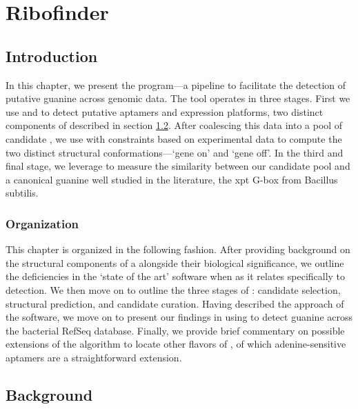 
\chapter{Ribofinder}
\label{ch:rfinder}


\section{Introduction}
\label{sec:rfinder:intro}

In this chapter, we present the \rfinder program---a pipeline to facilitate the
detection of putative guanine \rbs across genomic data. The \rfinder
tool operates in three stages. First we use \infernal and \tthp to detect
putative aptamers and expression platforms, two distinct components of
\rbs described in section \ref{sec:rfinder:bkgrnd}. After coalescing
this data into a pool of candidate \rbs, we use \rfold with constraints
based on experimental data to compute the two distinct structural
conformations---`gene on' and `gene off'. In the third and final stage, we
leverage \foldalign to measure the similarity between our candidate pool and a
canonical guanine \rb well studied in the literature, the xpt G-box
\rb from Bacillus subtilis.

\subsection{Organization}
\label{subsec:rfinder:org}

This chapter is organized in the following fashion. After providing background
on the structural components of a \rb alongside their biological
significance, we outline the deficiencies in the `state of the art' software
when as it relates specifically to \rb detection. We then move on to outline
the three stages of \rfinder: candidate selection, structural prediction, and
candidate curation. Having described the approach of the software, we move on
to present our findings in using \rfinder to detect guanine \rbs across
the bacterial RefSeq database. Finally, we provide brief commentary on possible
extensions of the algorithm to locate other flavors of \rbs, of which
adenine-sensitive aptamers are a straightforward extension.

\section{Background}
\label{sec:rfinder:bkgrnd}

